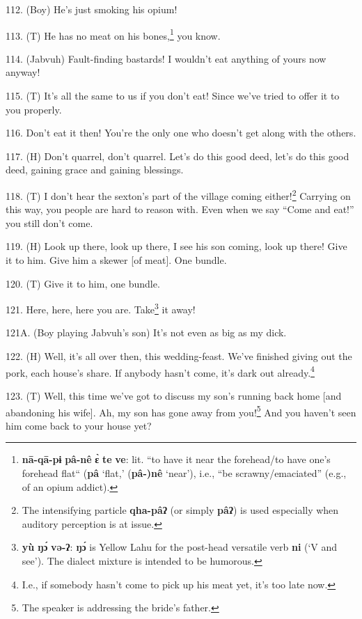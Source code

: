 112. (Boy) He's just smoking his opium!

113. (T) He has no meat on his bones,\footnote{\textbf{nā-qā-pɨ} \textbf{pâ-nê} \textbf{ɛ̀} \textbf{te} \textbf{ve}: lit. ``to have it near the forehead/to have one's forehead flat`` (\textbf{pâ} `flat,' (\textbf{pâ-)nê} `near'), i.e., ``be scrawny/emaciated'' (e.g., of an opium addict).} you know.


114. (Jabvuh) Fault-finding bastards! I wouldn't eat anything of yours now anyway!

115. (T) It's all the same to us if you don't eat! Since we've tried to offer it
to you properly.

116. Don't eat it then! You're the only one who doesn't get along with the others.

117. (H) Don't quarrel, don't quarrel. Let's do this good deed, let's do this good
deed, gaining grace and gaining blessings.

118. (T) I don't hear the sexton's part of the village coming either!\footnote{The intensifying particle \textbf{qha-pâʔ} (or simply \textbf{pâʔ}) is used especially when auditory perception is at issue.} Carrying
on this way, you people are hard to reason with. Even when we say ``Come
and eat!'' you still don't come.

119. (H) Look up there, look up there, I see his son coming, look up there! Give
it to him. Give him a skewer [of meat]. One bundle.

120. (T) Give it to him, one bundle.

121. Here, here, here you are. Take\footnote{\textbf{yù} \textbf{ŋɔ́} \textbf{və-ʔ}: \textbf{ŋɔ́} is Yellow Lahu for the post-head versatile verb \textbf{ni} (`V and see'). The dialect mixture is intended to be humorous.} it away!

121A. (Boy playing Jabvuh's son) It's not even as big as my dick. 

122. (H) Well, it's all over then, this wedding-feast. We've finished giving out
the pork, each house's share. If anybody hasn't come, it's dark out already.\footnote{I.e., if somebody hasn't come to pick up his meat yet, it's too late now.}

\begin{center}
\end{center}

123. (T) Well, this time we've got to discuss my son's running back home [and abandoning
his wife]. Ah, my son has gone away from you!\footnote{The speaker is addressing the bride's father.} And you haven't seen him come
back to your house yet?

